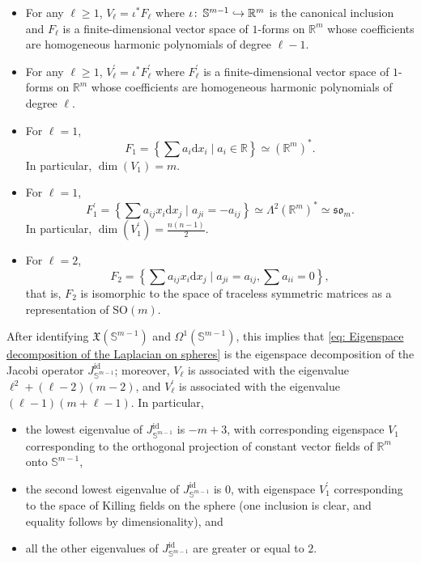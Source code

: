 \documentclass{article}
\numberwithin{equation}{section}        %
\theoremstyle{bfnote}
\theoremstyle{definition}
\theoremstyle{bfremark}
\newcommand{\col}{\colon \thinspace}        %
\newcommand{\R}{\mathbb{R}}                 %
\newcommand{\Sp}{\mathbb{S}}                %
\newcommand{\diff}{\mathrm{d}}                      %
\DeclareMathOperator{\id}{id}                   %
\begin{document}
\begin{itemize}
    \item For any $\ell \geq 1$, $V_\ell = \iota^* F_\ell$ where $\iota \col \Sp^{m-1} \hookrightarrow \R^m$ is the canonical inclusion and $F_\ell$ is a finite-dimensional vector space of $1$-forms on $\R^m$ whose coefficients are homogeneous harmonic polynomials of degree $\ell -1$.

    \item For any $\ell \geq 1$, $V^\prime_\ell = \iota^* F^\prime_\ell$ where $F^\prime_\ell$ is a finite-dimensional vector space of $1$-forms on $\R^m$ whose coefficients are homogeneous harmonic polynomials of degree $\ell$.

    \item For $\ell = 1$,
    \begin{equation*}
        F_1 = \left\{ \sum a_i \diff x_i \mid a_i \in \R \right\} \simeq (\R^m)^* .
    \end{equation*}
    In particular, $\dim(V_1) = m$.

    \item For $\ell = 1$,
    \begin{equation*}
        F^\prime_1 = \left\{ \sum a_{ij} x_i \diff x_j \mid a_{ji} = - a_{ij} \right\} \simeq \Lambda^2(\R^m)^* \simeq \mathfrak{so}_m.
    \end{equation*}
    In particular, $\dim(V^\prime_1) = \tfrac{n(n-1)}{2}$. 

    \item For $\ell = 2$,
    \begin{equation*}
        F_2 = \left\{ \sum a_{ij} x_i \diff x_j \mid a_{ji} = a_{ij}, \sum a_{ii} = 0 \right\},
    \end{equation*}
    that is, $F_2$ is isomorphic to the space of traceless symmetric matrices as a representation of $\mathrm{SO}(m)$. 
\end{itemize}

After identifying $\mathfrak{X}(\mathbb{S}^{m-1})$ and $\Omega^1(\mathbb{S}^{m-1})$, this implies that \eqref{eq: Eigenspace decomposition of the Laplacian on spheres} is the eigenspace decomposition of the Jacobi operator $J^{\id}_{\mathbb{S}^{m-1}}$; moreover, $V_\ell$ is associated with the eigenvalue $\ell^2 + (\ell-2)(m-2)$, and $V^\prime_\ell$ is associated with the eigenvalue $(\ell-1)(m+\ell-1)$. In particular,
\begin{itemize}
    \item the lowest eigenvalue of $J^{\id}_{\mathbb{S}^{m-1}}$ is $-m+3$, with corresponding eigenspace $V_1$ corresponding to the orthogonal projection of constant vector fields of $\R^m$ onto $\mathbb{S}^{m-1}$,
    \item the second lowest eigenvalue of $J^{\id}_{\mathbb{S}^{m-1}}$ is $0$, with eigenspace $V^\prime_1$ corresponding to the space of Killing fields on the sphere (one inclusion is clear, and equality follows by dimensionality), and
    \item all the other eigenvalues of $J^{\id}_{\mathbb{S}^{m-1}}$ are greater or equal to $2$.
\end{itemize}
\end{document}
